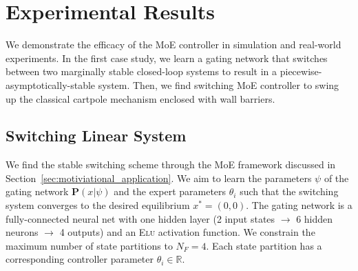 \section{Experimental Results}
\label{sec:moe_results}

We demonstrate the efficacy of the MoE controller in simulation
and real-world experiments.
%
In the first case study, we learn a gating network that switches between two
marginally stable closed-loop systems to result in a
piecewise-asymptotically-stable system.
%
Then, we find switching MoE controller to swing up the classical cartpole
mechanism enclosed with wall barriers.
%

\subsection{Switching Linear System}

We find the stable switching scheme through the MoE framework discussed in
Section~\ref{sec:motiviational_application}.
%
We aim to learn the parameters $\psi$ of the gating network $\mathbf{P}(x|
\psi)$ and the expert parameters $\theta_i$ such that the switching system
converges to the desired equilibrium $x^* = (0, 0)$.
%
The gating network is a fully-connected neural net with one hidden layer (2 input states 
$\rightarrow$ 6 hidden neurons $\rightarrow$ 4 outputs) and an \textsc{Elu} activation
function\cite{clevert2015fast}.
%
We constrain the maximum number of state partitions to $N_F=4$.
%
Each state partition has a corresponding controller parameter $\theta_i \in
\mathbb{R}$. 
%

